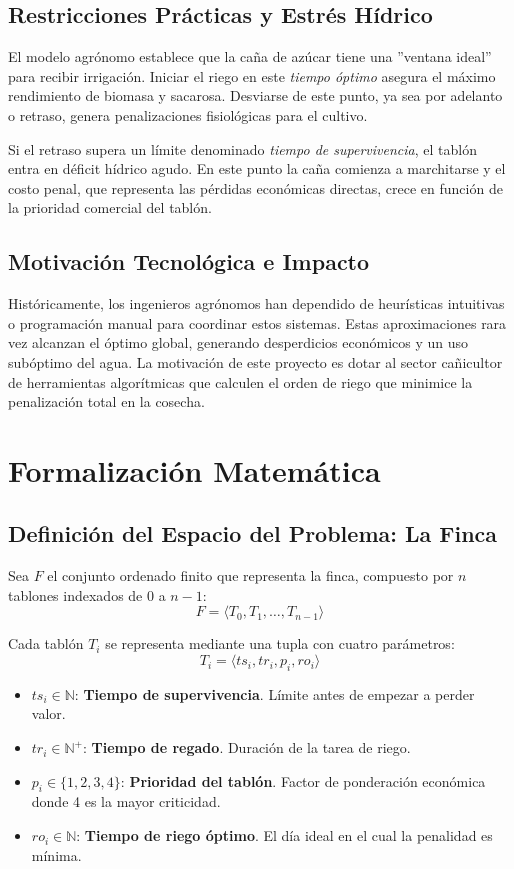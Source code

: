 \documentclass[conference, a4paper]{IEEEtran}
\begin{document}
\subsection{Restricciones Prácticas y Estrés Hídrico}
El modelo agrónomo establece que la caña de azúcar tiene una ''ventana ideal'' para recibir irrigación. Iniciar el riego en este \textit{tiempo óptimo} asegura el máximo rendimiento de biomasa y sacarosa. Desviarse de este punto, ya sea por adelanto o retraso, genera penalizaciones fisiológicas para el cultivo.

Si el retraso supera un límite denominado \textit{tiempo de supervivencia}, el tablón entra en déficit hídrico agudo. En este punto la caña comienza a marchitarse y el costo penal, que representa las pérdidas económicas directas, crece en función de la prioridad comercial del tablón.

\subsection{Motivación Tecnológica e Impacto}
Históricamente, los ingenieros agrónomos han dependido de heurísticas intuitivas o programación manual para coordinar estos sistemas. Estas aproximaciones rara vez alcanzan el óptimo global, generando desperdicios económicos y un uso subóptimo del agua. La motivación de este proyecto es dotar al sector cañicultor de herramientas algorítmicas que calculen el orden de riego que minimice la penalización total en la cosecha.

\section{Formalización Matemática}
\subsection{Definición del Espacio del Problema: La Finca}
Sea $F$ el conjunto ordenado finito que representa la finca, compuesto por $n$ tablones indexados de 0 a $n-1$:
\begin{equation}
F = \langle T_0, T_1, \dots, T_{n-1} \rangle
\end{equation}

Cada tablón $T_i$ se representa mediante una tupla con cuatro parámetros:
\begin{equation}
T_i = \langle ts_i, tr_i, p_i, ro_i \rangle
\end{equation}

\begin{itemize}
    \item $ts_i \in \mathbb{N}$: \textbf{Tiempo de supervivencia}. Límite antes de empezar a perder valor.
    \item $tr_i \in \mathbb{N}^+$: \textbf{Tiempo de regado}. Duración de la tarea de riego.
    \item $p_i \in \{1, 2, 3, 4\}$: \textbf{Prioridad del tablón}. Factor de ponderación económica donde 4 es la mayor criticidad.
    \item $ro_i \in \mathbb{N}$: \textbf{Tiempo de riego óptimo}. El día ideal en el cual la penalidad es mínima.
\end{itemize}
\end{document}
